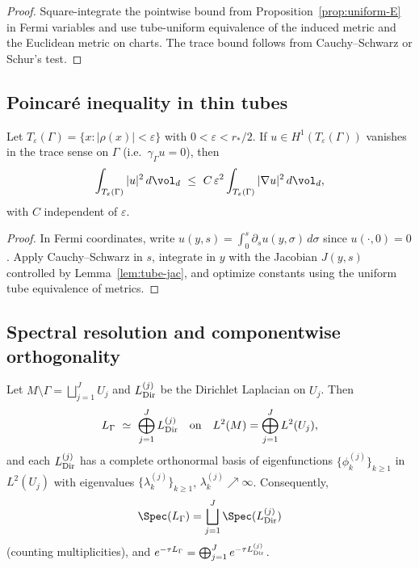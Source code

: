 \begin{proof}
Square-integrate the pointwise bound from Proposition~\ref{prop:uniform-E} in Fermi variables and use tube-uniform equivalence of the induced metric and the Euclidean metric on charts. The trace bound follows from Cauchy–Schwarz or Schur’s test.
\end{proof}

\subsection{Poincaré inequality in thin tubes}
\begin{lemma}
\label{lem:tube-poincare}
Let $T_\varepsilon(\Gamma)=\{x:|\rho(x)|<\varepsilon\}$ with $0<\varepsilon<r_*/2$. 
If $u\in H^1(T_\varepsilon(\Gamma))$ vanishes in the trace sense on $\Gamma$ (i.e.\ $\gamma_\Gamma u=0$), then
\[
\int_{T_\varepsilon(\Gamma)} |u|^2\,d\vol_d \ \le\ C\,\varepsilon^2\int_{T_\varepsilon(\Gamma)} |\nabla u|^2\,d\vol_d,
\]
with $C$ independent of $\varepsilon$.
\end{lemma}

\begin{proof}
In Fermi coordinates, write $u(y,s)=\int_0^s \partial_s u(y,\sigma)\,d\sigma$ since $u(\cdot,0)=0$. 
Apply Cauchy–Schwarz in $s$, integrate in $y$ with the Jacobian $J(y,s)$ controlled by Lemma~\ref{lem:tube-jac}, and optimize constants using the uniform tube equivalence of metrics.
\end{proof}

\subsection{Spectral resolution and componentwise orthogonality}
\begin{theorem}
\label{thm:spectral-resolution}
Let $M\setminus\Gamma=\bigsqcup_{j=1}^J U_j$ and $L^{(j)}_{\rm Dir}$ be the Dirichlet Laplacian on $U_j$. Then
\[
L_\Gamma \ \simeq\ \bigoplus_{j=1}^J L^{(j)}_{\rm Dir}\quad\text{on}\quad
L^2(M)=\bigoplus_{j=1}^J L^2(U_j),
\]
and each $L^{(j)}_{\rm Dir}$ has a complete orthonormal basis of eigenfunctions $\{\phi^{(j)}_k\}_{k\ge1}$ in $L^2(U_j)$ with eigenvalues $\{\lambda^{(j)}_k\}_{k\ge1}$, $\lambda^{(j)}_k\nearrow\infty$. Consequently,
\[
\Spec(L_\Gamma)=\bigsqcup_{j=1}^J \Spec(L^{(j)}_{\rm Dir})
\]
(counting multiplicities), and $e^{-\tau L_\Gamma}=\bigoplus_{j=1}^J e^{-\tau L^{(j)}_{\rm Dir}}$.
\end{theorem}

